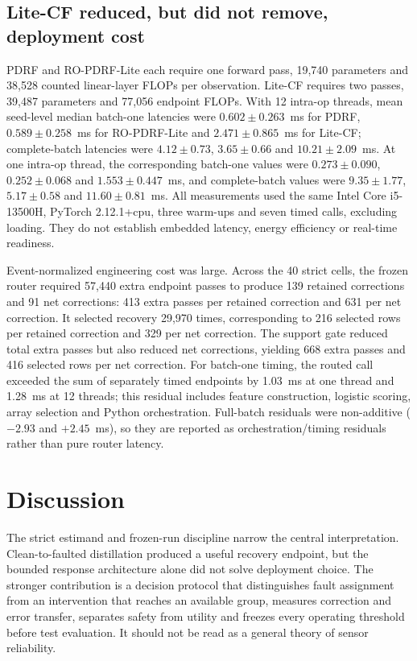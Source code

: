 \documentclass[11pt]{article}
\begin{document}
\subsection{Lite-CF reduced, but did not remove, deployment cost}

PDRF and RO-PDRF-Lite each require one forward pass, 19,740 parameters and 38,528 counted linear-layer FLOPs per observation. Lite-CF requires two passes, 39,487 parameters and 77,056 endpoint FLOPs. With 12 intra-op threads, mean seed-level median batch-one latencies were $0.602\pm0.263$~ms for PDRF, $0.589\pm0.258$~ms for RO-PDRF-Lite and $2.471\pm0.865$~ms for Lite-CF; complete-batch latencies were $4.12\pm0.73$, $3.65\pm0.66$ and $10.21\pm2.09$~ms. At one intra-op thread, the corresponding batch-one values were $0.273\pm0.090$, $0.252\pm0.068$ and $1.553\pm0.447$~ms, and complete-batch values were $9.35\pm1.77$, $5.17\pm0.58$ and $11.60\pm0.81$~ms. All measurements used the same Intel Core i5-13500H, PyTorch 2.12.1+cpu, three warm-ups and seven timed calls, excluding loading. They do not establish embedded latency, energy efficiency or real-time readiness.

Event-normalized engineering cost was large. Across the 40 strict cells, the frozen router required 57,440 extra endpoint passes to produce 139 retained corrections and 91 net corrections: 413 extra passes per retained correction and 631 per net correction. It selected recovery 29,970 times, corresponding to 216 selected rows per retained correction and 329 per net correction. The support gate reduced total extra passes but also reduced net corrections, yielding 668 extra passes and 416 selected rows per net correction. For batch-one timing, the routed call exceeded the sum of separately timed endpoints by 1.03~ms at one thread and 1.28~ms at 12 threads; this residual includes feature construction, logistic scoring, array selection and Python orchestration. Full-batch residuals were non-additive ($-2.93$ and $+2.45$~ms), so they are reported as orchestration/timing residuals rather than pure router latency.

\section{Discussion}

The strict estimand and frozen-run discipline narrow the central interpretation. Clean-to-faulted distillation produced a useful recovery endpoint, but the bounded response architecture alone did not solve deployment choice. The stronger contribution is a decision protocol that distinguishes fault assignment from an intervention that reaches an available group, measures correction and error transfer, separates safety from utility and freezes every operating threshold before test evaluation. It should not be read as a general theory of sensor reliability.
\end{document}
